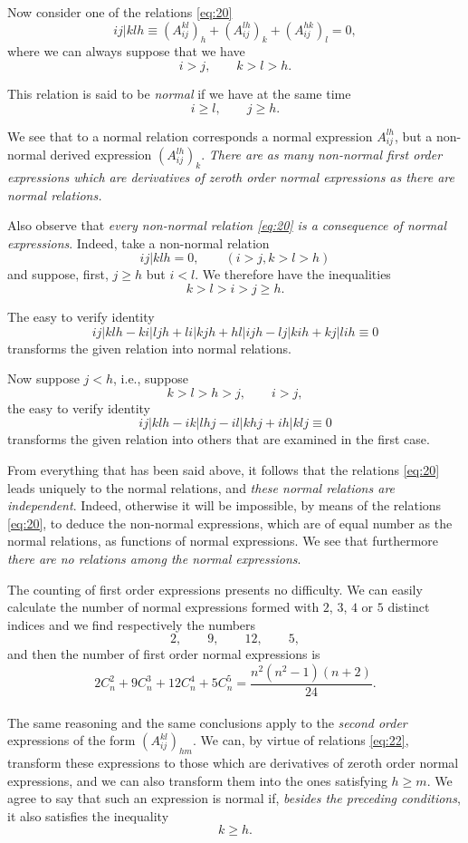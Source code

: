 \documentclass[leqno,12pt]{article}
\theoremstyle{shape1}
\theoremstyle{shape0}
\theoremstyle{shape2}
\theoremstyle{definition}
\begin{document}
Now consider one of the relations \eqref{eq:20}
\[
ij|klh\equiv (A^{kl}_{ij})_{h}+(A^{lh}_{ij})_{k}+(A^{hk}_{ij})_{l}=0,
\]
where we can always suppose that we have
\[
i>j,\qquad k>l>h.
\]

This relation is said to be \emph{normal} if we have at the same time
\[
i\ge l,\qquad j\ge h.
\]

We see that to a normal relation corresponds a normal expression $A^{lh}_{ij}$, but a non-normal derived expression $(A^{lh}_{ij})_{k}$. \emph{There are as many non-normal first order expressions which are derivatives of zeroth order normal expressions as there are normal relations.}

Also observe that \emph{every non-normal relation \eqref{eq:20} is a consequence of normal expressions}. Indeed, take a non-normal relation
\[
ij|klh=0,\qquad(i>j,k>l>h)
\]
and suppose, first, $j\ge h$ but $i<l$. We therefore have the inequalities
\[
k>l>i>j\ge h.
\]

The easy to verify identity
\[
ij|klh-ki|ljh+li|kjh+hl|ijh-lj|kih+kj|lih\equiv 0
\]
transforms the given relation into normal relations.

Now suppose $j<h$, i.e., suppose
\[
k>l>h>j,\qquad i>j,
\]
the easy to verify identity
\[
ij|klh-ik|lhj-il|khj+ih|klj\equiv 0
\]
transforms the given relation into others that are examined in the first case.

From everything that has been said above, it follows that the relations \eqref{eq:20} leads uniquely to the normal relations, and \emph{these normal relations are independent}. Indeed, otherwise it will be impossible, by means of the relations \eqref{eq:20}, to deduce the non-normal expressions, which are of equal number as the normal relations, as functions of normal expressions. We see that furthermore \emph{there are no relations among the normal expressions}.

The counting of first order expressions presents no difficulty. We can easily calculate the number of normal expressions formed with $2$, $3$, $4$ or $5$ distinct indices and we find respectively the numbers
\[
2,\qquad 9,\qquad 12,\qquad 5,
\]
and then the number of first order normal expressions is
\[
2C^{2}_{n}+9C^{3}_{n}+12C^{4}_{n}+5C^{5}_{n}=\frac{n^{2}(n^{2}-1)(n+2)}{24}.
\]


\paragraph{}
\label{sec:12}
The same reasoning and the same conclusions apply to the \emph{second order} expressions of the form $(A^{kl}_{ij})_{hm}$. We can, by virtue of relations \eqref{eq:22}, transform these expressions to those which are derivatives of zeroth order normal expressions, and we can also transform them into the ones satisfying $h\ge m$. We agree to say that such an expression is normal if, \emph{besides the preceding conditions}, it also satisfies the inequality
\begin{equation}
  \label{eq:29}
  k\ge h.
\end{equation}
\end{document}
